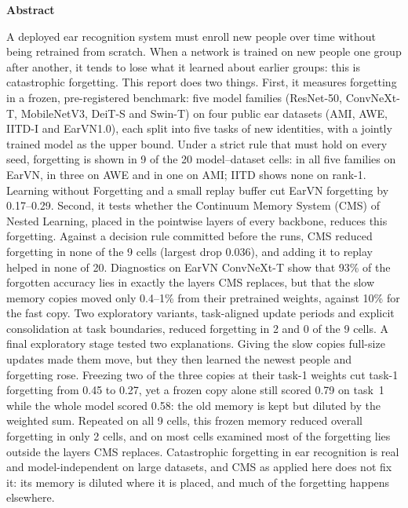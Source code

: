 \documentclass[12pt,a4paper]{report}
\begin{document}
\begin{center}
\vspace*{0.6cm}
{\Large\bfseries Abstract}
\end{center}
\vspace{0.6cm}
\noindent A deployed ear recognition system must enroll new people over time without being retrained from scratch. When a network is trained on new people one group after another, it tends to lose what it learned about earlier groups: this is catastrophic forgetting. This report does two things. First, it measures forgetting in a frozen, pre-registered benchmark: five model families (ResNet-50, ConvNeXt-T, MobileNetV3, DeiT-S and Swin-T) on four public ear datasets (AMI, AWE, IITD-I and EarVN1.0), each split into five tasks of new identities, with a jointly trained model as the upper bound. Under a strict rule that must hold on every seed, forgetting is shown in 9 of the 20 model--dataset cells: in all five families on EarVN, in three on AWE and in one on AMI; IITD shows none on rank-1. Learning without Forgetting and a small replay buffer cut EarVN forgetting by 0.17--0.29. Second, it tests whether the Continuum Memory System (CMS) of Nested Learning, placed in the pointwise layers of every backbone, reduces this forgetting. Against a decision rule committed before the runs, CMS reduced forgetting in none of the 9 cells (largest drop 0.036), and adding it to replay helped in none of 20. Diagnostics on EarVN ConvNeXt-T show that 93\% of the forgotten accuracy lies in exactly the layers CMS replaces, but that the slow memory copies moved only 0.4--1\% from their pretrained weights, against 10\% for the fast copy. Two exploratory variants, task-aligned update periods and explicit consolidation at task boundaries, reduced forgetting in 2 and 0 of the 9 cells. A final exploratory stage tested two explanations. Giving the slow copies full-size updates made them move, but they then learned the newest people and forgetting rose. Freezing two of the three copies at their task-1 weights cut task-1 forgetting from 0.45 to 0.27, yet a frozen copy alone still scored 0.79 on task~1 while the whole model scored 0.58: the old memory is kept but diluted by the weighted sum. Repeated on all 9 cells, this frozen memory reduced overall forgetting in only 2 cells, and on most cells examined most of the forgetting lies outside the layers CMS replaces. Catastrophic forgetting in ear recognition is real and model-independent on large datasets, and CMS as applied here does not fix it: its memory is diluted where it is placed, and much of the forgetting happens elsewhere.
\end{document}
